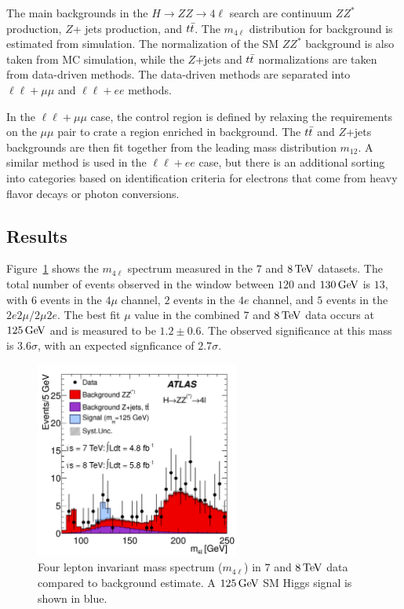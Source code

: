 The main backgrounds in the $H\to ZZ \to 4\ell$ search are continuum $ZZ^*$ production, $Z$+ jets production, and $t\bar{t}$. The $m_{4\ell}$ distribution for background is estimated from simulation. The normalization of the SM $ZZ^*$ background is also taken from MC simulation, while the $Z$+jets and $t\bar{t}$ normalizations are taken from data-driven methods. The data-driven methods are separated into $\ell\ell+\mu\mu$ and $\ell\ell+ee$ methods. 

In the $\ell\ell+\mu\mu$ case, the control region is defined by relaxing the requirements on the $\mu\mu$ pair to crate a region enriched in background. The $t\bar{t}$ and $Z$+jets backgrounds are then fit together from the leading mass distribution $m_{12}$. A similar method is used in the $\ell\ell+ee$ case, but there is an additional sorting into categories based on identification criteria for electrons that come from heavy flavor decays or photon conversions. 

\subsection{Results}

Figure~\ref{fig:disc_zz_result} shows the $m_{4\ell}$ spectrum measured in the $7$ and $8 \TeV$ datasets. The total number of events observed in the window between $120$ and $130 \GeV$ is $13$, with $6$ events in the $4\mu$ channel, $2$ events in the $4e$ channel, and $5$ events in the $2e2\mu/2\mu2e$. The best fit $\mu$ value in the combined $7$ and $8 \TeV$ data occurs at $125 \GeV$ and is measured to be $1.2 \pm 0.6$. The observed significance at this mass is $3.6\sigma$, with an expected signficance of $2.7\sigma$. 

\begin{figure}[h!]
  \centering
  \captionsetup{justification=centering}
  \includegraphics[width=0.6\textwidth]{figures/discovery_m4l}
  \caption{Four lepton invariant mass spectrum ($m_{4\ell}$) in $7$ and $8 \TeV$ data compared to background estimate. A $125 \GeV$ SM Higgs signal is shown in blue\cite{Discovery}.}
  \label{fig:disc_zz_result}
\end{figure}

